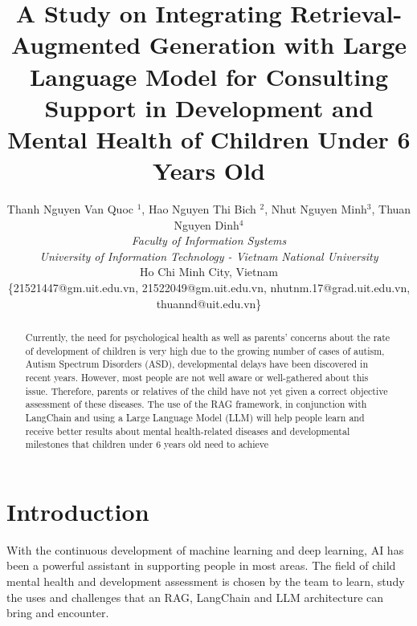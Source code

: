 \documentclass[conference]{IEEEtran}
\begin{document}
\title{A Study on Integrating Retrieval-Augmented Generation with Large Language Model for Consulting Support in Development and Mental Health of Children Under 6 Years Old}

\author{
Thanh Nguyen Van Quoc $^{1}$, Hao Nguyen Thi Bich $^{2}$, Nhut Nguyen Minh$^{3}$, Thuan Nguyen Dinh$^{4}$\\
\textit{Faculty of Information Systems} \\
\textit{University of Information Technology - Vietnam National University} \\
Ho Chi Minh City, Vietnam \\
\{21521447@gm.uit.edu.vn, 21522049@gm.uit.edu.vn, nhutnm.17@grad.uit.edu.vn, thuannd@uit.edu.vn\}
}


\maketitle


\begin{abstract}
    Currently, the need for psychological health as well as parents’ concerns about the rate of development of children is very high due to the growing number of cases of autism, Autism Spectrum Disorders (ASD), developmental delays have been discovered in recent years. However, most people are not well aware or well-gathered about this issue. Therefore, parents or relatives of the child have not yet given a correct objective assessment of these diseases. The use of the RAG framework, in conjunction with LangChain and using a Large Language Model (LLM) will help people learn and receive better results about mental health-related diseases and developmental milestones that children under 6 years old need to achieve
\end{abstract}
\section{Introduction}
\label{sec:introduction}
With the continuous development of machine learning and deep learning, AI has been a powerful assistant in supporting people in most areas. The field of child mental health and development assessment is chosen by the team to learn, study the uses and challenges that an RAG, LangChain and LLM architecture can bring and encounter.
\end{document}
